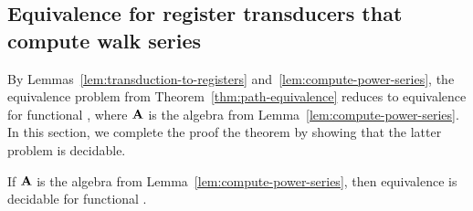 \subsection{Equivalence for register transducers that compute walk series}\label{sec:decide-power-series}
By Lemmas~\ref{lem:transduction-to-registers} and~\ref{lem:compute-power-series}, the  equivalence problem from Theorem~\ref{thm:path-equivalence} reduces to equivalence for functional \regTsover{\aalg}, where $\mathbf{A}$ is the algebra from Lemma~\ref{lem:compute-power-series}. In this section, we complete the proof the theorem by showing that the latter problem is decidable.
\begin{lemma}\label{lem:functionality-decidable-power-series} If $\mathbf{A}$ is the algebra from Lemma~\ref{lem:compute-power-series}, then equivalence is decidable for functional \regTsover{\aalg}. 
\end{lemma}
